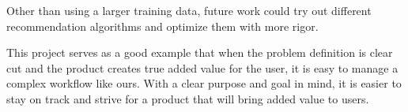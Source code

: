 \documentclass[a4paper,12pt,bibliography=totoc,numbers=noenddot,sfdefaults=false,abstract=true,notitlepage]{scrartcl} %
\begin{document}
	
	Other than using a larger training data, future work could try out different recommendation algorithms and optimize them with more rigor.
	
	This project serves as a good example that when the problem definition is clear cut and the product creates true added value for the user, it is easy to manage a complex workflow like ours. With a clear purpose and goal in mind, it is easier to stay on track and strive for a product that will bring added value to users.
	
	\FloatBarrier
	\printbibliography
	
	
	
	

	
	
	\clearpage
	\setcounter{secnumdepth}{3} %
	\appendix %
	
	\renewcommand{\thefigure}{S\arabic{figure}}
	\setcounter{figure}{0}
	\renewcommand{\thetable}{S\arabic{table}}
	\setcounter{table}{0}
	
	\renewcommand{\thepage}{Appendix \Roman{page}} %
	
	\label{------APPENDIX------} %
	
	\FloatBarrier
	
	\clearpage
	
	
	
	
	
\end{document}

